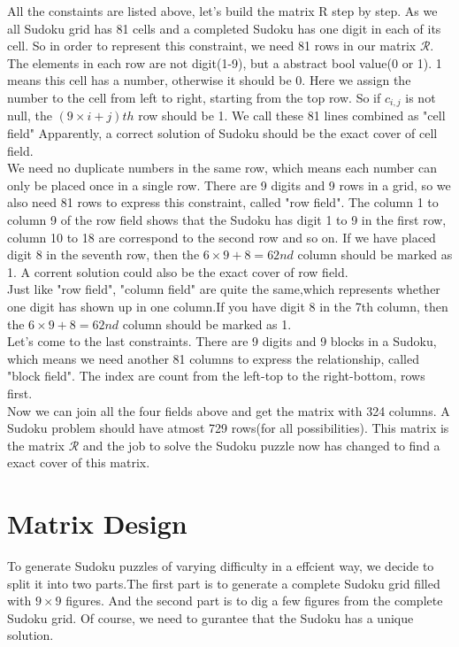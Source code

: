 \documentclass{mcmthesis}
\begin{document}
\indent All the constaints are listed above, let's build the matrix R step by step. As we all Sudoku grid has 81 cells and a completed Sudoku has one digit in each of its cell. So in order to represent this constraint, we need 81 rows in our matrix $\mathcal{R}$. The elements in each row are not digit(1-9), but a abstract bool value(0 or 1). 1 means this cell has a number, otherwise it should be 0. Here we assign the number to the cell from left to right, starting from the top row. So if $\textit{c}_{i,j}$ is not null, the $(9\times i + j)th$ row should be 1. We call these 81 lines combined as "cell field" Apparently, a correct solution of Sudoku should be the exact cover of cell field.\\
\indent We need no duplicate numbers in the same row, which means each number can only be placed once in a single row. There are 9 digits and 9 rows in a grid, so we also need 81 rows to express this constraint, called "row field". The column 1 to column 9 of the row field shows that the Sudoku has digit 1 to 9 in the first row, column 10 to 18 are correspond to the second row and so on. If we have placed digit 8 in the seventh row, then the $6\times9+8=62nd$ column should be marked as 1. A corrent solution could also be the exact cover of row field.\\
\indent Just like "row field", "column field" are quite the same,which represents whether one digit has shown up in one column.If you have digit 8 in the 7th column, then the  $6\times9+8=62nd$ column should be marked as 1.\\
\indent Let's come to the last constraints. There are 9 digits and 9 blocks in a Sudoku, which means we need another 81 columns to express the relationship, called "block field". The index are count from the left-top to the right-bottom, rows first. \\
\indent Now we can join all the four fields above and get the matrix with 324 columns. A Sudoku problem should have atmost 729 rows(for all possibilities). This matrix is the matrix $\mathcal{R}$ and the job to solve the Sudoku puzzle now has changed to find a exact cover of this matrix. \newline 
\section{Matrix Design}
\indent To generate Sudoku puzzles of varying difficulty in a effcient way, we decide to split it into two parts.The first part is to generate a complete Sudoku grid filled with $9\times9$ figures. And the second part is to dig a few figures from the complete Sudoku grid. Of course, we need to gurantee that the Sudoku has a unique solution.
\end{document}

